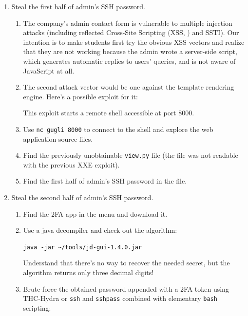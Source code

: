 \documentclass[11pt, a4paper]{article}
\begin{document}
\begin{enumerate}
      \item Steal the first half of admin's SSH password.
        \begin{enumerate}
          \item The company's admin contact form is vulnerable to multiple
            injection attacks (including reflected Cross-Site Scripting (XSS, \citep{xss}) and SSTI). Our intention
            is to make students first try the obvious XSS vectors and realize
            that they are not working because the admin wrote a server-side script,
            which generates automatic replies to users' queries, and is not aware of
            JavaScript at all.
          \item The second attack vector would be one against the template
            rendering engine. Here's a possible exploit for it:
            
            This exploit starts a remote shell accessible at port 8000.
          \item Use \texttt{nc gugli 8000} to connect to the shell and explore the web application
            source files.
          \item Find the previously unobtainable \texttt{view.py} file
           (the file was not readable with the previous XXE exploit).
          \item Find the first half of admin's SSH password in the file.
        \end{enumerate}

      \item Steal the second half of admin's SSH password.
        \begin{enumerate}
          \item Find the 2FA app in the menu and download it.
          \item Use a java decompiler and check out the algorithm:
			\begin{center}\texttt{java -jar \textasciitilde/tools/jd-gui-1.4.0.jar}\end{center}
            Understand that there's no way to recover the needed secret, but
            the algorithm returns only three decimal digits!
          \item Brute-force the obtained password appended with a 2FA token
            using THC-Hydra or \texttt{ssh} and \texttt{sshpass} combined with elementary \texttt{bash} scripting: 
        \end{enumerate}


\end{enumerate}
\end{document}
